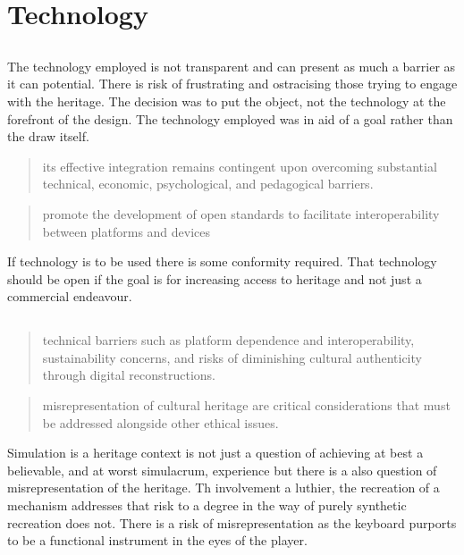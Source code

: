 \section{Technology}

\subsection{\cite{villena_challenges_2025}}
 The technology employed is not transparent and can present as much a barrier as it can potential. There is risk of frustrating and ostracising those trying to engage with the heritage. The decision was to put the object, not the technology at the forefront of the design. The technology employed was in aid of a goal rather than the draw itself.

 \begin{quotation}
      its effective integration remains contingent upon overcoming substantial technical, economic, psychological, and pedagogical barriers.
 \end{quotation}

\begin{quotation}
    promote the development of open standards to facilitate interoperability between platforms and devices
\end{quotation}

If technology is to be used there is some conformity required. That technology should be open if the goal is for increasing access to heritage and not just a commercial endeavour.

\subsection{\cite{wang_grand_2025}}


\begin{quotation}
    technical barriers such as platform dependence and interoperability, sustainability concerns, and risks of diminishing cultural authenticity through digital reconstructions.
\end{quotation}


\begin{quotation}
    misrepresentation of cultural heritage are critical considerations that must be addressed alongside other ethical issues.
\end{quotation}

Simulation is a heritage context is not just a question of achieving at best a believable,  and at worst simulacrum, experience but there is a also question of misrepresentation of the heritage. Th involvement a luthier, the recreation of a mechanism addresses that risk to a degree in the way of purely synthetic recreation does not.
There is a risk of misrepresentation as the keyboard purports to be a functional instrument in the eyes of the player.

